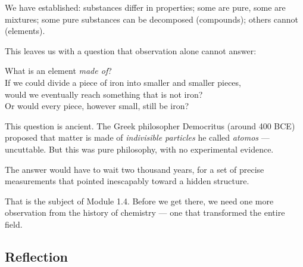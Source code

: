 \documentclass[12pt, a4paper]{book}
\theoremstyle{definition}
\begin{document}
We have established:
substances differ in properties;
some are pure, some are mixtures;
some pure substances can be decomposed (compounds);
others cannot (elements).

This leaves us with a question that observation alone cannot answer:

\begin{center}
\begin{tcolorbox}[
  enhanced, colback=PuzzleColor!8, colframe=PuzzleColor,
  width=0.82\textwidth, arc=3pt,
  fontupper=\sffamily\large\bfseries, halign=center
]
What is an element \emph{made of}?\\[4pt]
\normalfont\normalsize\sffamily
If we could divide a piece of iron into smaller and smaller pieces,\\
would we eventually reach something that is not iron?\\
Or would every piece, however small, still be iron?
\end{tcolorbox}
\end{center}

\vspace{0.5em}

This question is ancient.
The Greek philosopher Democritus (around 400 BCE)
proposed that matter is made of \emph{indivisible particles}
he called \emph{atomos} — uncuttable.
But this was pure philosophy, with no experimental evidence.

The answer would have to wait two thousand years,
for a set of precise measurements that pointed inescapably
toward a hidden structure.

That is the subject of Module 1.4.
Before we get there, we need one more observation
from the history of chemistry — one that transformed
the entire field.

\subsection*{Reflection}
\end{document}
